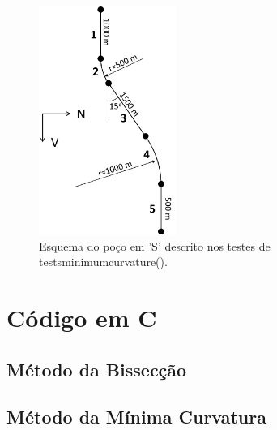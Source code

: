 \documentclass[final,3p,12pt]{elsarticle}
\begin{document}
\begin{figure}[hbt!]
    \label{fig:pocoS}
    \centering
    \includegraphics[width=0.4\textwidth]{EsquemaPoco}
    \caption{Esquema do poço em 'S' descrito nos testes de tests\textunderscore minimum\textunderscore curvature().}
\end{figure}

\newpage
\FloatBarrier
\section{Código em C}

\subsection{Método da Bissecção}


\subsection{Método da Mínima Curvatura}

\end{document}
